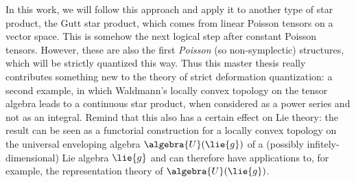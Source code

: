 In this work, we will follow this approach and apply it to 
another type of star product, the Gutt star product, which comes from linear 
Poisson tensors on a vector space. This is somehow the next logical step after 
constant Poisson tensors. However, these are also the first \emph{Poisson} (so 
non-symplectic) structures, which will be strictly quantized this way. Thus this 
master thesis really contributes something new to the theory of strict 
deformation quantization: a second example, in which Waldmann's locally convex 
topology on the tensor algebra leads to a continuous star product, when 
considered as a power series and not as an integral. Remind that this also has a 
certain effect on Lie theory: the result can be seen as a functorial 
construction for a locally convex topology on the universal enveloping algebra 
$\algebra{U}(\lie{g})$ of a (possibly infitely-dimensional) Lie algebra 
$\lie{g}$ and can therefore have applications to, for example, the 
representation theory of $\algebra{U}(\lie{g})$.
